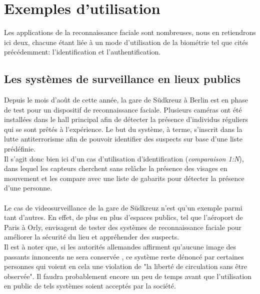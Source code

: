 \section{Exemples d'utilisation}
Les applications de la reconnaissance faciale sont nombreuses, nous en retiendrons ici deux, chacune étant liée à un mode d'utilisation de la biométrie tel que cités précédemment: l'identification et l'authentification.
\subsection{Les systèmes de surveillance en lieux publics}
Depuis le mois d'août de cette année, la gare de Südkreuz à Berlin est en phase de test pour un dispositif de reconnaissance faciale. Plusieurs caméras ont été installées dans le hall principal afin de détecter la présence d'individus réguliers qui se sont prêtés à l'expérience. Le but du système, à terme, s'inscrit dans la lutte antiterrorisme afin de pouvoir identifier des suspects sur base d'une liste prédéfinie.
\\
Il s'agit donc bien ici d'un cas d'utilisation d'identification (\textit{comparaison 1:N}), dans lequel les capteurs cherchent sans relâche la présence des visages en mouvement et les compare avec une liste de gabarits pour détecter la présence d'une personne.
\paragraph{}
Le cas de videosurveillance de la gare de Südkreuz n'est qu'un exemple parmi tant d'autres. En effet, de plus en plus d'espaces publics, tel que l'aéroport de Paris à Orly, envisagent de tester des systèmes de reconnaissance faciale pour améliorer la sécurité du lieu et appréhender des suspects.
\\
Il est à noter que, si les autorités allemandes affirment qu'aucune image des passants innoncents ne sera conservée \cite{Xmisc_6}, ce système reste dénoncé par certaines personnes qui voient en cela une violation de "la liberté de circulation sans être observée". Il faudra probablement encore un peu de temps avant que l'utilisation en public de tels systèmes soient acceptés par la société.

